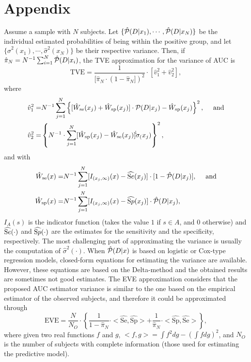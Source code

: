 \section*{Appendix}
Assume a sample with $N$ subjects. Let $\{\hat {\cal P}(D|x_1),\cdots , \hat {\cal P}(D|x_N)\}$ be the individual estimated probabilities of being within the positive group, and let $\{ \hat\sigma^2(x_1), \cdots , \hat\sigma^2(x_N)\}$ be their respective variance. 
Then, if $\hat\pi_N= N^{-1}\sum_{i=1}^N \hat {\cal P}(D|x_i)$, the TVE approximation for the variance of AUC is
\begin{equation*}
\text{TVE}= \frac{1}{[\hat\pi_N\cdot (1 - \hat\pi_N])^2}\cdot [\hat v_1^2 + \hat v_2^2],
\end{equation*}
where
\begin{align*}
\hat v_1^2=& N^{-1}\sum_{j=1}^N \left\{ [\hat W_{\text{se}}(x_j) + \hat W_{\text{sp}}(x_j)]\cdot {\cal P}(D|x_j) - \hat W_{\text{sp}}(x_j)\right\}^2, \quad\text{ and} \\
\hat v_2^2=& \left\{ N^{-1}\cdot \sum_{j=1}^N [\hat W_{\text{sp}}(x_j) - \hat W_{\text{se}}(x_j)]\dot\hat\sigma_(x_j)\right\}^2,
\end{align*}
and with
\begin{align*}
\hat W_{\text{se}}(x)=& N^{-1}\sum_{j=1}^N[I_{(x_j,\infty)}(x) - \widehat {\text Se}(x_j)]\cdot [ 1 - \hat {\cal P}(D|x_j)],  \quad\text{ and} \\
\hat W_{\text{sp}}(x)=& N^{-1}\sum_{j=1}^N[I_{(x_j,\infty)}(x) - \widehat {\text Sp}(x_j)]\cdot \hat {\cal P}(D|x_j),
\end{align*}
$I_A(s)$ is the indicator function (takes the value $1$ if $s\in A$, and $0$ otherwise) and $\widehat {\text Se}(\cdot)$ and $\widehat {\text Sp}(\cdot)$ are the estimates for the sensitivity and the specificity, respectively. The most challenging part of approximating the variance is usually the computation of $\hat\sigma^2(\cdot)$. When $\hat {\cal P}(D|x)$ is based on logistic or Cox-type regression models, closed-form equations for estimating the variance are available. However, these equations are 
based on the Delta-method and the obtained results are sometimes not good estimates. The EVE approximation considers that the proposed AUC estimator variance is similar to the one based on the empirical estimator of the observed subjects, and therefore it could be approximated through
\begin{equation*}
\text{EVE}= \frac{N}{N_O}\cdot \left\{ \frac{1}{1-\hat\pi_N}\cdot <\widehat {\text{Se}}, \widehat {\text {Sp}}> + \frac{1}{\hat\pi_N}\cdot <\widehat {\text{Sp}}, \widehat {\text {Se}}>\right\},
\end{equation*}
where given two real functions $f$ and $g$, $<f,g>=\int f^2dg - (\int fdg)^2$, and $N_O$ is the number of subjects with complete information (those used for estimating the predictive model).


